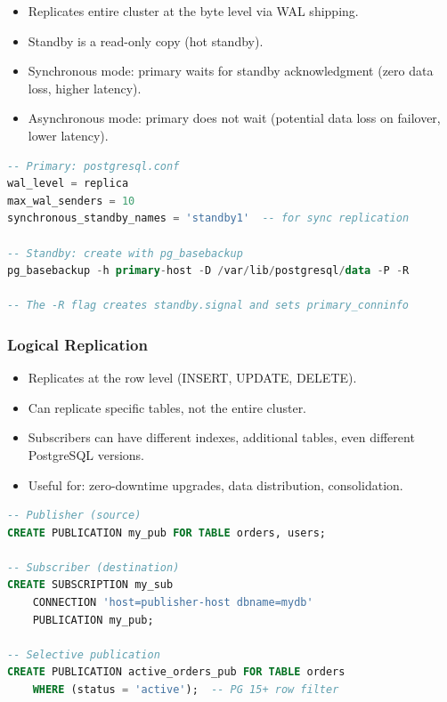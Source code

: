 \documentclass[12pt,a4paper]{article}
\begin{document}
\begin{itemize}
    \item Replicates entire cluster at the byte level via WAL shipping.
    \item Standby is a read-only copy (hot standby).
    \item Synchronous mode: primary waits for standby acknowledgment (zero data loss, higher latency).
    \item Asynchronous mode: primary does not wait (potential data loss on failover, lower latency).
\end{itemize}

\begin{lstlisting}[language=SQL, caption={PostgreSQL streaming replication}]
-- Primary: postgresql.conf
wal_level = replica
max_wal_senders = 10
synchronous_standby_names = 'standby1'  -- for sync replication

-- Standby: create with pg_basebackup
pg_basebackup -h primary-host -D /var/lib/postgresql/data -P -R

-- The -R flag creates standby.signal and sets primary_conninfo
\end{lstlisting}

\subsubsection{Logical Replication}

\begin{itemize}
    \item Replicates at the row level (INSERT, UPDATE, DELETE).
    \item Can replicate specific tables, not the entire cluster.
    \item Subscribers can have different indexes, additional tables, even different PostgreSQL versions.
    \item Useful for: zero-downtime upgrades, data distribution, consolidation.
\end{itemize}

\begin{lstlisting}[language=SQL, caption={Logical replication}]
-- Publisher (source)
CREATE PUBLICATION my_pub FOR TABLE orders, users;

-- Subscriber (destination)
CREATE SUBSCRIPTION my_sub
    CONNECTION 'host=publisher-host dbname=mydb'
    PUBLICATION my_pub;

-- Selective publication
CREATE PUBLICATION active_orders_pub FOR TABLE orders
    WHERE (status = 'active');  -- PG 15+ row filter
\end{lstlisting}
\end{document}
